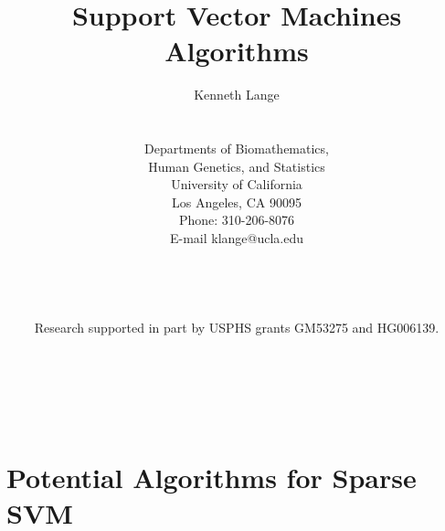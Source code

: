 \documentclass[11pt]{article}
\title{Support Vector Machines Algorithms}
\author{Kenneth Lange
\\
\\
\\
Departments of Biomathematics, \\
Human Genetics, and Statistics \\
University of California \\
Los Angeles, CA 90095\\
Phone: 310-206-8076 \\
E-mail klange@ucla.edu \\
\\
\\
\\
\\
Research supported in part by USPHS grants GM53275 and HG006139.}
\newcommand{\lvskip}{\vspace{.5in}}
\begin{document}
\maketitle

\noindent  \\ \\
\lvskip


\newpage
{}

\baselineskip=20pt

\section*{\center Potential Algorithms for Sparse SVM}
\end{document}
